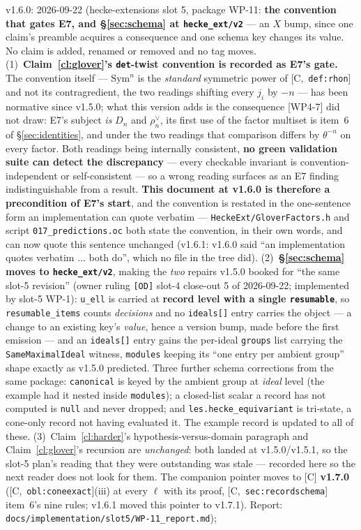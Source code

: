 \documentclass[11pt]{article}
\theoremstyle{remark}
\newcommand{\Sym}{\mathrm{Sym}}
\newcommand{\Dn}{D_n}
\newcommand{\HA}[1]{[C,~\texttt{#1}]}      %
\begin{document}
v1.6.0: 2026-09-22 (hecke-extensions slot 5, package WP-11: \textbf{the
convention that gates E7, and \S\ref{sec:schema} at \texttt{hecke\_ext/v2}} --- an $X$ bump,
since one claim's preamble acquires a consequence and one schema key changes its value. No
claim is added, renamed or removed and no tag moves.
(1)~\textbf{Claim~\ref{cl:glover}'s \texttt{det}-twist convention is recorded as E7's
gate.} The convention itself --- $\Sym^n$ is the \emph{standard} symmetric power of
\HA{def:rhon} and not its contragredient, the two readings shifting every $j_i$ by $-n$ ---
has been normative since v1.5.0; what this version adds is the consequence [WP4-7] did not
draw: E7's subject \emph{is} $\Dn$ and $\rho_n^{\vee}$, its first use of the factor multiset
is item~6 of \S\ref{sec:identities}, and under the two readings that comparison differs by
$\theta^{-n}$ on every factor. Both readings being internally consistent, \textbf{no green
validation suite can detect the discrepancy} --- every checkable invariant is
convention-independent or self-consistent --- so a wrong reading surfaces as an E7 finding
indistinguishable from a result. \textbf{This document at v1.6.0 is therefore a precondition
of E7's start}, and the convention is restated in the one-sentence form an implementation
can quote verbatim --- \texttt{HeckeExt/GloverFactors.h} and script
\texttt{017\_predictions.oc} both state the convention, in their own words, and can now
quote this sentence unchanged (v1.6.1: v1.6.0 said ``an implementation quotes verbatim
$\ldots$ both do'', which no file in the tree did).
(2)~\textbf{\S\ref{sec:schema} moves to \texttt{hecke\_ext/v2}}, making the \emph{two}
repairs v1.5.0 booked for ``the same slot-5 revision'' (owner ruling \texttt{[OD]} slot-4
close-out 5 of 2026-09-22; implemented by slot-5 WP-1): \texttt{u\_ell} is carried at
\textbf{record level with a single \texttt{resumable}}, so \texttt{resumable\_items} counts
\emph{decisions} and no \texttt{ideals[]} entry carries the object --- a change to an
existing key's \emph{value}, hence a version bump, made before the first emission --- and an
\texttt{ideals[]} entry gains the per-ideal \texttt{groups} list carrying the
\texttt{SameMaximalIdeal} witness, \texttt{modules} keeping its ``one entry per ambient
group'' shape exactly as v1.5.0 predicted. Three further schema corrections from the same
package: \texttt{canonical} is keyed by the ambient group at \emph{ideal} level (the example
had it nested inside \texttt{modules}); a closed-list scalar a record has not computed is
\texttt{null} and never dropped; and \texttt{les.hecke\_equivariant} is tri-state, a
cone-only record not having evaluated it. The example record is updated to all of these.
(3)~Claim~\ref{cl:harder}'s hypothesis-versus-domain paragraph and Claim~\ref{cl:glover}'s
recursion are \emph{unchanged}: both landed at v1.5.0/v1.5.1, so the slot-5 plan's reading
that they were outstanding was stale --- recorded here so the next reader does not look for
them. The companion pointer moves to [C] \textbf{v1.7.0}
(\HA{obl:coneexact}(iii) at every $\ell$ with its proof, \HA{sec:recordschema} item~6's nine
rules; v1.6.1 moved this pointer to v1.7.1). Report:
\texttt{docs/implementation/slot5/WP-11\_report.md});
\end{document}
